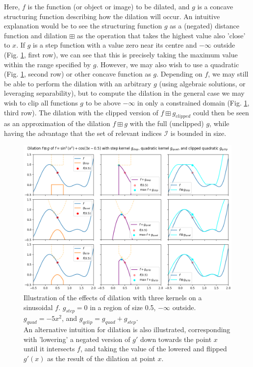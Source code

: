 \documentclass[a4paper, 12pt]{report}
\begin{document}
Here, $f$ is the function (or object or image) to be dilated, and $g$ is a concave structuring function describing how the dilation will occur. An intuitive explanation would be to see the structuring function $g$ as a (negated) distance function and dilation $\boxplus$ as the operation that takes the highest value also 'close' to $x$. If $g$ is a step function with a value zero near its centre and $-\infty$ outside (Fig. \ref{fig:dil-illust}, first row), we can see that this is precisely taking the maximum value within the range specified by $g$. However, we may also wish to use a quadratic (Fig. \ref{fig:dil-illust}, second row) or other concave function as $g$. Depending on $f$, we may still be able to perform the dilation with an arbitrary $g$ (using algebraic solutions, or leveraging separability), but to compute the dilation in the general case we may wish to clip all functions $g$ to be above $-\infty$ in only a constrained domain (Fig. \ref{fig:dil-illust}, third row). The dilation with the clipped version of $f\boxplus g_{clipped}$ could then be seen as an approximation of the dilation $f\boxplus g$ with the full (unclipped) $g$, while having the advantage that the set of relevant indices $\mathcal{I}$ is bounded in size.

\begin{figure}[h!]
  \includegraphics[width=\textwidth]{figures/dilation_illustration.png}
  \caption{Illustration of the effects of dilation with three kernels on a sinusoidal $f$. $g_{step}=0$ in a region of size 0.5, $-\infty$ outside. $g_{quad}=-5x^2$, and $g_{qclip}=g_{quad}+g_{step}$. \\An alternative intuition for dilation is also illustrated, corresponding with 'lowering' a negated version of $g'$ down towards the point $x$ until it intersects $f$, and taking the value of the lowered and flipped $g'(x)$ as the result of the dilation at point $x$.}
  \label{fig:dil-illust}
\end{figure}
\end{document}
